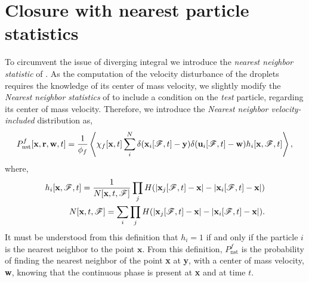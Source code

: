 \section{Closure with nearest particle statistics}

To circumvent the issue of diverging integral we introduce the \textit{nearest neighbor statistic} of \citet{zhang2021ensemble}. 
As the computation of the velocity disturbance of the droplets requires the knowledge of its center of mass velocity, we slightly modify the \textit{Nearest neighbor statistics} of \citet{zhang2021ensemble} to include a condition on the \textit{test} particle, regarding its center of mass velocity.
Therefore,  we introduce the \textit{Nearest neighbor velocity-included} distribution as, 
\begin{equation}
    P_\text{nst}^f[\textbf{x},\textbf{r},\textbf{w},t]
    = \frac{1}{\phi_f}\left<
        \chi_f[\textbf{x},t]
        \sum_i^N 
        \delta(\textbf{x}_i[\mathscr{F},t]-\textbf{y})
        \delta(\textbf{u}_i[\mathscr{F},t]-\textbf{w})
        h_i[\textbf{x},\mathscr{F},t]
    \right>,
\end{equation}
where,
\begin{align}
    \label{eq:h_i_def}
    h_i[\textbf{x},\FF,t]
    = \frac{1}{N[\textbf{x},t,\FF]}
    \prod_j H(|\textbf{x}_j[\FF,t] - \textbf{x}| - |\textbf{x}_i[\FF,t] - \textbf{x}|)\\
    \label{eq:N_def}
    N[\textbf{x},t,\FF]
    = \sum_i\prod_jH(|\textbf{x}_j[\FF,t] - \textbf{x}| - |\textbf{x}_i[\FF,t] - \textbf{x}|).
\end{align}
It must be understood from this definition that $h_i=1$ if and only if the particle $i$ is the nearest neighbor to the point $\textbf{x}$. 
From this definition, $P_\text{nst}^f$ is the probability of finding the nearest neighbor of the point \textbf{x} at \textbf{y}, with a center of mass velocity, \textbf{w}, knowing that the continuous phase is present at \textbf{x} and at time $t$. 


